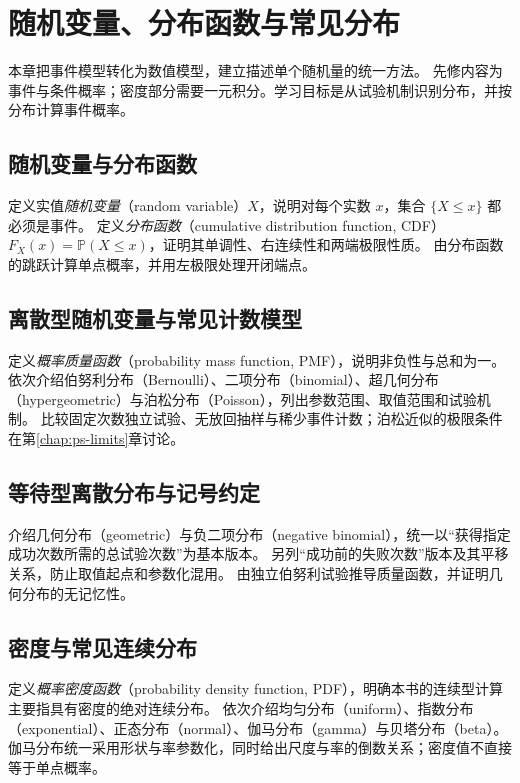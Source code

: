 \setcounter{chapter}{2} %
\chapter{随机变量、分布函数与常见分布}
\label{chap:ps-univariate}

本章把事件模型转化为数值模型，建立描述单个随机量的统一方法。
先修内容为事件与条件概率；密度部分需要一元积分。学习目标是从试验机制识别分布，并按分布计算事件概率。

\section{随机变量与分布函数}
\label{sec:ps-random-variable-cdf}
定义实值\emph{随机变量}（random variable）$X$，说明对每个实数 $x$，集合 $\{X\leq x\}$ 都必须是事件。
定义\emph{分布函数}（cumulative distribution function, CDF）$F_X(x)=\mathbb P(X\leq x)$，证明其单调性、右连续性和两端极限性质。
由分布函数的跳跃计算单点概率，并用左极限处理开闭端点。

\section{离散型随机变量与常见计数模型}
\label{sec:ps-discrete-distributions}
定义\emph{概率质量函数}（probability mass function, PMF），说明非负性与总和为一。
依次介绍伯努利分布（Bernoulli）、二项分布（binomial）、超几何分布（hypergeometric）与泊松分布（Poisson），列出参数范围、取值范围和试验机制。
比较固定次数独立试验、无放回抽样与稀少事件计数；泊松近似的极限条件在第\ref{chap:ps-limits}章讨论。

\section{等待型离散分布与记号约定}
\label{sec:ps-discrete-waiting}
介绍几何分布（geometric）与负二项分布（negative binomial），统一以“获得指定成功次数所需的总试验次数”为基本版本。
另列“成功前的失败次数”版本及其平移关系，防止取值起点和参数化混用。
由独立伯努利试验推导质量函数，并证明几何分布的无记忆性。

\section{密度与常见连续分布}
\label{sec:ps-continuous-distributions}
定义\emph{概率密度函数}（probability density function, PDF），明确本书的连续型计算主要指具有密度的绝对连续分布。
依次介绍均匀分布（uniform）、指数分布（exponential）、正态分布（normal）、伽马分布（gamma）与贝塔分布（beta）。
伽马分布统一采用形状与率参数化，同时给出尺度与率的倒数关系；密度值不直接等于单点概率。

